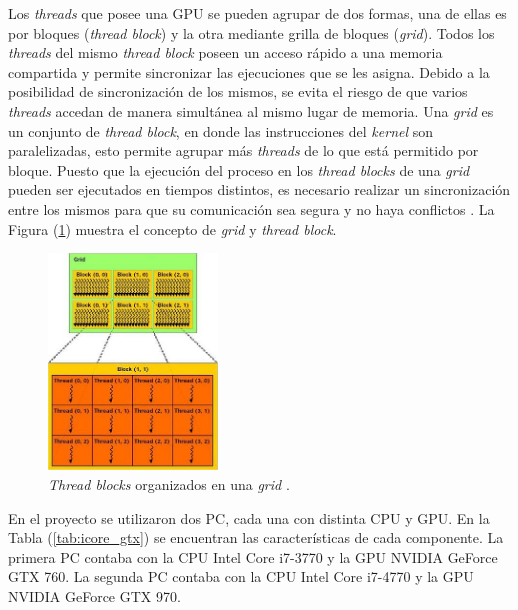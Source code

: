 Los \textit{threads} que posee una GPU se pueden agrupar de dos formas, una de ellas es por bloques (\textit{thread block}) y la otra mediante grilla de bloques (\textit{grid}). Todos los \textit{threads} del mismo \textit{thread block} poseen un acceso rápido a una memoria compartida y permite sincronizar las ejecuciones que se les asigna. Debido a la posibilidad de sincronización de los mismos, se evita el riesgo de que varios \textit{threads} accedan de manera simultánea al mismo lugar de memoria. Una \textit{grid} es un conjunto de \textit{thread block}, en donde las instrucciones del \textit{kernel} son paralelizadas, esto permite agrupar más \textit{threads} de lo que está permitido por bloque. Puesto que la ejecución del proceso en los \textit{thread blocks} de una \textit{grid} pueden ser ejecutados en tiempos distintos, es necesario realizar un sincronización entre los mismos para que su comunicación sea segura y no haya conflictos \cite{tolke2010implementation}. La Figura (\ref{fig:block_grid_threads}) muestra el concepto de \textit{grid} y \textit{thread block}.

\newpage
\begin{figure}[h!]
	\centering
	\includegraphics[width=0.4\textwidth]{figs/cap3/threads_block_grid.jpg}
	\caption{\textit{Thread blocks} organizados en una \textit{grid} \cite{rinaldi2011modelos}.}
	\label{fig:block_grid_threads}
\end{figure}

En el proyecto se utilizaron dos PC, cada una con distinta CPU y GPU. En la Tabla (\ref{tab:icore_gtx}) se encuentran las características de cada componente. La primera PC contaba con la CPU Intel Core i7-3770 y la GPU NVIDIA GeForce GTX 760. La segunda PC contaba con la CPU Intel Core i7-4770 y la GPU NVIDIA GeForce GTX 970.


